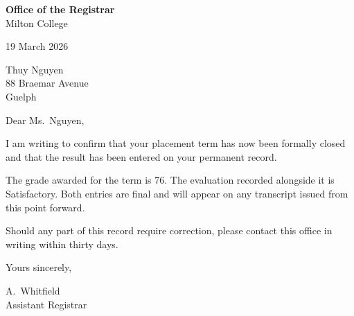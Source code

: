 \documentclass[11pt]{article}
\begin{document}
{\large\bfseries Office of the Registrar}\\
{\small Milton College}

\vspace{2em}

19 March 2026

\vspace{1.5em}

Thuy Nguyen\\
88 Braemar Avenue\\
Guelph

\vspace{1.5em}

Dear Ms.\ Nguyen,

I am writing to confirm that your placement term has now been formally closed
and that the result has been entered on your permanent record.

The grade awarded for the term is 76. The evaluation recorded alongside it is
Satisfactory. Both entries are final and will appear on any transcript issued
from this point forward.

Should any part of this record require correction, please contact this office in
writing within thirty days.

\vspace{1.5em}

Yours sincerely,

\vspace{2.5em}

A.\ Whitfield\\
{\small Assistant Registrar}
\end{document}
